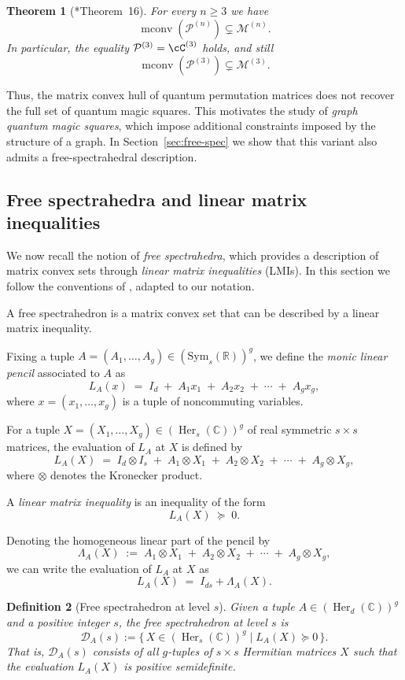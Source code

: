 \documentclass[11pt, a4paper]{article}
\theoremstyle{plain}
\newtheorem{theorem}{Theorem}[section]
\newtheorem{definition}[theorem]{Definition}
\theoremstyle{definition}
\theoremstyle{remark}
\newcommand{\C}{\mathbb{C}}
\newcommand{\cM}{\mathcal{M}} \newcommand{\cN}{\mathcal{N}} \newcommand{\cO}{\mathcal{O}}
\newcommand{\cP}{\mathcal{P}} \newcommand{\cQ}{\mathcal{Q}} \newcommand{\cR}{\mathcal{R}}
\newcommand{\Her}[2][\C]{\operatorname{Her}_{#2}(#1)}
\newcommand{\Sym}[1]{\mathrm{Sym}_{#1}(\mathbb{R})}
\begin{document}
\begin{theorem}[{\cite{DDN20}*{Theorem~16}}]
For every \(n \ge 3\) we have
\[
\operatorname{mconv}(\cP^{(n)}) \subsetneq \cM^{(n)}.
\]
In particular, the equality \(\cP^{(3)} = \cC^{(3)}\) holds, and still
\[
\operatorname{mconv}(\cP^{(3)}) \subsetneq \cM^{(3)}.
\]
\end{theorem}


 Thus, the matrix convex hull of quantum permutation matrices does not recover the full set of quantum magic squares. This motivates the study of \emph{graph quantum magic squares}, which impose additional constraints imposed by the structure of a graph. In Section~\ref{sec:free-spec} we show that this variant also admits a free-spectrahedral description. 


\subsection{Free spectrahedra and linear matrix inequalities}



We now recall the notion of \emph{free spectrahedra}, which provides a description of matrix convex sets 
through \emph{linear matrix inequalities} (LMIs).   
In this section we follow the conventions of \cite{EH19}, adapted to our notation.

\medskip

A free spectrahedron is a matrix convex set that can be described by a linear matrix inequality.  

Fixing a tuple \(A = (A_1,\dots,A_g) \in ( \Sym s )^g\), we define the \emph{monic linear pencil} associated to \(A\) as 
\[
L_A(x) \;=\; I_d \;+\; A_1 x_1 \;+\; A_2 x_2 \;+\; \cdots \;+\; A_g x_g,
\]
where \(x = (x_1,\dots,x_g)\) is a tuple of noncommuting variables.  

For a tuple \(X = (X_1,\dots,X_g) \in ( \Her s )^g\) of real symmetric \(s \times s\) matrices, 
the evaluation of \(L_A\) at \(X\) is defined by
\[
L_A(X) \;=\; I_d \otimes I_s \;+\; A_1 \otimes X_1 \;+\; A_2 \otimes X_2 \;+\; \cdots \;+\; A_g \otimes X_g,
\]
where \(\otimes\) denotes the Kronecker product.  

A \emph{linear matrix inequality  } is an inequality of the form
\[
L_A(X) \;\succeq\; 0.
\]

Denoting the homogeneous linear part of the pencil by
\[
\Lambda_A(X) \;:=\; A_1 \otimes X_1 \;+\; A_2 \otimes X_2 \;+\; \cdots \;+\; A_g \otimes X_g,
\]
we can write the evaluation of \(L_A\) at \(X\) as
\[
L_A(X) \;=\; I_{ds} + \Lambda_A(X).
\]
\begin{definition}[Free spectrahedron at level \(s\)]
Given a tuple \(A \in (\Her d)^g\) and a positive integer \(s\), the \emph{free spectrahedron at level \(s\)} is
\[
\mathcal{D}_A(s) := \{\, X \in (\Her s)^g \mid L_A(X) \succeq 0 \,\}.
\]
That is, \(\mathcal{D}_A(s)\) consists of all \(g\)-tuples of \(s \times s\) Hermitian matrices \(X\)
such that the evaluation \(L_A(X)\) is positive semidefinite.
\end{definition}
\end{document}
